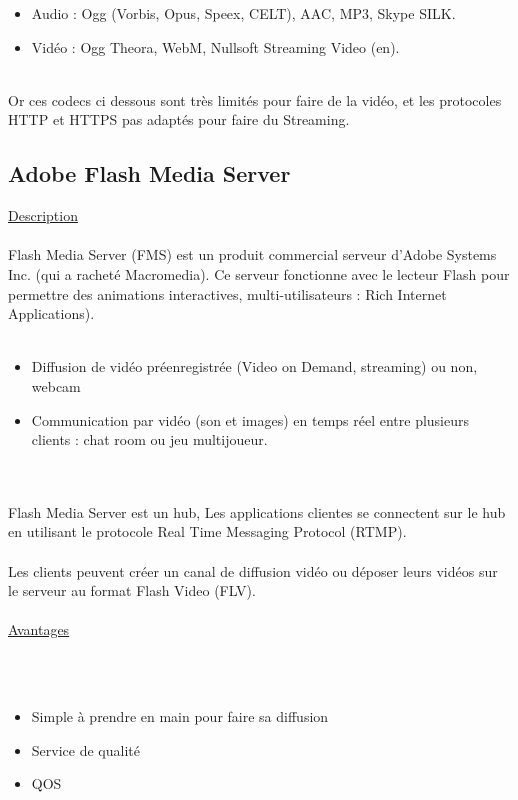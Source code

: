\documentclass{report}
\begin{document}
    
    \begin{itemize}
    \item Audio : Ogg (Vorbis, Opus, Speex, CELT), AAC, MP3, Skype SILK.
    \item Vidéo : Ogg Theora, WebM, Nullsoft Streaming Video (en).
    \end{itemize} 


    \hfill
    \\
    Or ces codecs ci dessous sont très limités pour faire de la vidéo, et les protocoles HTTP et HTTPS pas adaptés pour faire du Streaming.
    
        \subsection{Adobe Flash Media Server}
    
        
    \underline{Description}
    \\
    
    \\
    Flash Media Server (FMS) est un produit commercial serveur d'Adobe Systems Inc. (qui a racheté Macromedia). Ce serveur fonctionne avec le lecteur Flash pour permettre des animations interactives, multi-utilisateurs : Rich Internet Applications). 
    \\
    \\
    \begin{itemize}
    \item Diffusion de vidéo préenregistrée (Video on Demand, streaming) ou non, webcam
    \item Communication par vidéo (son et images) en temps réel entre plusieurs clients : chat room ou jeu multijoueur.
    \end{itemize}
    \\
    \\
    Flash Media Server est un hub, Les applications clientes se connectent sur le hub en utilisant le protocole Real Time Messaging Protocol (RTMP). 
    \\
    \\
    Les clients peuvent créer un canal de diffusion vidéo ou déposer leurs vidéos sur le serveur au format Flash Video (FLV).
    \\
   
    \\
    \underline{Avantages}

    \\
    \\
    \begin{itemize}
    \item Simple à prendre en main pour faire sa diffusion
    \item Service de qualité
    \item QOS
    \end{itemize}
  
\end{document}
